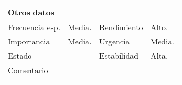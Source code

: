 \documentclass{article}
\begin{document}
\begin{table}[h]
\begin{tabular}{|l|l|l|l|l|l|}
\hline
\multicolumn{6}{|p{10cm}|}{Otros datos}\\
\hline
\multicolumn{1}{|p{2cm}|}{Frecuencia esp.} & \multicolumn{2}{p{3cm}}{Media.} & \multicolumn{1}{|p{2cm}|}{Rendimiento} & \multicolumn{2}{p{3cm}|}{Alto.}\\
\hline
\multicolumn{1}{|p{2cm}|}{Importancia} & \multicolumn{2}{p{3cm}}{Media.} & \multicolumn{1}{|p{2cm}|}{Urgencia} & \multicolumn{2}{p{3cm}|}{Media.}\\
\hline
\multicolumn{1}{|p{2cm}|}{Estado} & \multicolumn{2}{p{3cm}}{} & \multicolumn{1}{|p{2cm}|}{Estabilidad} & \multicolumn{2}{p{3cm}|}{Alta.}\\
\hline
\multicolumn{6}{|p{10cm}|}{Comentario}\\
\hline
\multicolumn{6}{|p{10cm}|}{}\\
\hline
\end{tabular}
\end{table}
\addtocounter{ni}{1}
\end{document}
